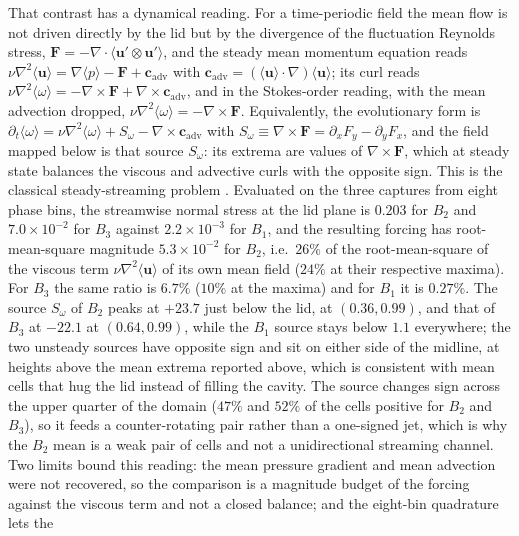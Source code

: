 \documentclass[11pt,a4paper]{article}
\newenvironment{chgadd}{\par\color{blue}}{\par\color{black}}
\begin{document}
\begin{chgadd}
That contrast has a dynamical reading. For a time-periodic field the mean flow is
not driven directly by the lid but by the divergence of the fluctuation Reynolds
stress, $\mathbf{F}=-\nabla\cdot\langle\mathbf{u}'\otimes\mathbf{u}'\rangle$, and the
steady mean momentum equation reads
$\nu\nabla^2\langle\mathbf{u}\rangle=\nabla\langle p\rangle-\mathbf{F}
+\mathbf{c}_{\mathrm{adv}}$ with
$\mathbf{c}_{\mathrm{adv}}=(\langle\mathbf{u}\rangle\cdot\nabla)\langle\mathbf{u}\rangle$;
its curl reads
$\nu\nabla^2\langle\omega\rangle=-\nabla\times\mathbf{F}
+\nabla\times\mathbf{c}_{\mathrm{adv}}$, and in the Stokes-order reading, with the
mean advection dropped, $\nu\nabla^2\langle\omega\rangle=-\nabla\times\mathbf{F}$.
Equivalently, the evolutionary form is
$\partial_t\langle\omega\rangle=\nu\nabla^2\langle\omega\rangle+S_\omega
-\nabla\times\mathbf{c}_{\mathrm{adv}}$ with
$S_\omega\equiv\nabla\times\mathbf{F}=\partial_xF_y-\partial_yF_x$, and the field
mapped below is that source $S_\omega$: its extrema are values of
$\nabla\times\mathbf{F}$, which at steady state balances the viscous and advective
curls with the opposite sign. This is the
classical steady-streaming problem \cite{riley2001streaming}. Evaluated on the
three captures from eight phase bins, the streamwise normal stress at the lid plane
is $0.203$ for $B_2$ and $7.0\times10^{-2}$ for $B_3$ against
$2.2\times10^{-3}$ for $B_1$, and the resulting forcing has root-mean-square
magnitude $5.3\times10^{-2}$ for $B_2$, i.e.\ $26\%$ of the root-mean-square of the
viscous term $\nu\nabla^2\langle\mathbf{u}\rangle$ of its own mean field ($24\%$ at
their respective maxima). For $B_3$ the same ratio is $6.7\%$ ($10\%$ at the
maxima) and for $B_1$ it is $0.27\%$. The source $S_\omega$
of $B_2$ peaks at $+23.7$ just below the lid, at $(0.36,0.99)$, and that of $B_3$ at
$-22.1$ at $(0.64,0.99)$, while the $B_1$ source stays below $1.1$ everywhere;
the two unsteady sources have opposite sign and sit on either side of the midline,
at heights above the mean extrema reported above, which is consistent with mean
cells that hug the lid instead of filling the cavity. The source changes sign across
the upper quarter of the domain ($47\%$ and $52\%$ of the cells positive for $B_2$
and $B_3$), so it feeds a counter-rotating pair rather than a one-signed jet, which
is why the $B_2$ mean is a weak pair of cells and not a unidirectional streaming
channel.
Two limits bound this reading: the mean pressure gradient and mean advection were
not recovered, so the comparison is a magnitude budget of the forcing against the
viscous term and not a closed balance; and the eight-bin quadrature lets the

\end{chgadd}
\end{document}
